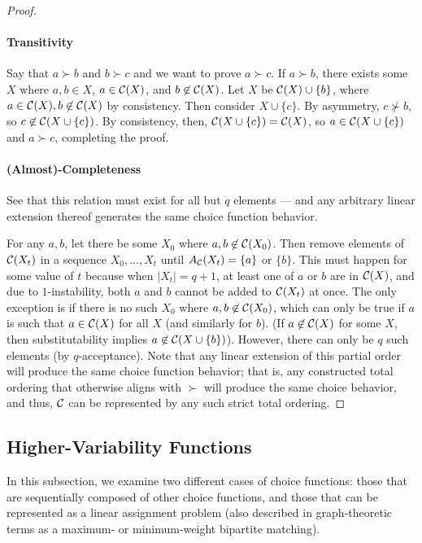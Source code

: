 \begin{proof}
\paragraph{Transitivity}
Say that $a \succ b$ and $b \succ c$ and we want to prove $a \succ c$. If $a \succ b$, there exists some $X$ where $a, b \in X$, $a \in \mathcal{C}(X)$, and $b \not\in \mathcal{C}(X)$. Let $X$ be $\mathcal{C}(X) \cup \{b\}$, where $a \in \mathcal{C}(X), b \not\in\mathcal{C}(X)$ by consistency. Then consider $X \cup \{c\}$. By asymmetry, $c \not\succ b$, so $c \not\in \mathcal{C}(X\cup \{c\})$. By consistency, then, $\mathcal{C}(X\cup \{c\}) = \mathcal{C}(X)$, so $a \in \mathcal{C}(X\cup \{c\})$ and $a \succ c$, completing the proof.

\paragraph{(Almost)-Completeness}
See that this relation must exist for all but $q$ elements --- and any arbitrary linear extension thereof generates the same choice function behavior.

For any $a, b$, let there be some $X_0$ where $a, b \not\in \mathcal{C}(X_0)$. Then remove elements of $\mathcal{C}(X_t)$ in a sequence $X_0, ..., X_t$ until $A_{\mathcal{C}}(X_t) = \{a\}$ or $\{b\}$. This must happen for some value of $t$ because when $|X_t| = q+1$, at least one of $a$ or $b$ are in $\mathcal{C}(X)$, and due to $1$-instability, both $a$ and $b$ cannot be added to $\mathcal{C}(X_t)$ at once. The only exception is if there is no such $X_0$ where $a, b \not\in \mathcal{C}(X_0)$, which can only be true if $a$ is such that $a \in \mathcal{C}(X)$ for all $X$ (and similarly for $b$). (If $a \not\in \mathcal{C}(X)$ for some $X$, then substitutability implies $a \not\in \mathcal{C}(X \cup \{b\})$). However, there can only be $q$ such elements (by $q$-acceptance). Note that any linear extension of this partial order will produce the same choice function behavior; that is, any constructed total ordering that otherwise aligns with $\succ$ will produce the same choice behavior, and thus, $\mathcal{C}$ can be represented by any such strict total ordering.
\end{proof}

\subsection{Higher-Variability Functions} \label{sec:high-variability-appendix}
In this subsection, we examine two different cases of choice functions: those that are sequentially composed of other choice functions, and those that can be represented as a linear assignment problem (also described in graph-theoretic terms as a maximum- or minimum-weight bipartite matching).

